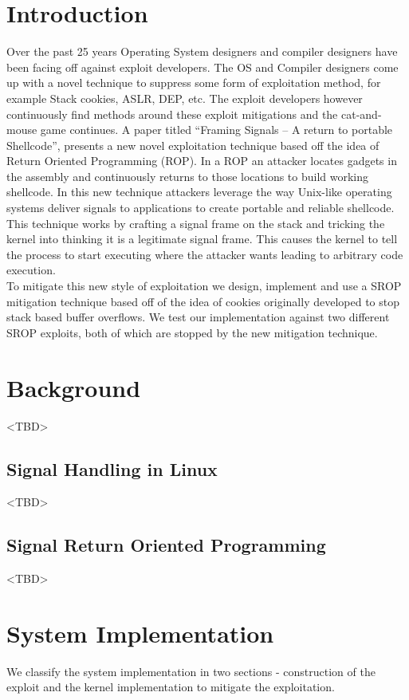 \documentclass{sig-alternate-05-2015}
\begin{document}
\section{Introduction}
Over the past 25 years Operating System designers and compiler designers have been facing off against exploit developers. The OS and Compiler designers  come up with a novel technique to suppress some form of exploitation method, for example Stack cookies, ASLR, DEP, etc. The exploit developers however continuously find methods around these exploit mitigations and the cat-and-mouse game continues.  A paper titled “Framing Signals -- A return to portable Shellcode”,  presents a new novel exploitation technique based off the idea of Return Oriented Programming (ROP). In a ROP an attacker locates gadgets in the assembly and continuously returns to those locations to build working shellcode. In this new technique attackers leverage the way Unix-like operating systems deliver signals to applications to create portable and reliable shellcode. This technique works by crafting a signal frame on the stack and tricking the kernel into thinking it is a legitimate signal frame. This causes the kernel to tell the process to start executing where the attacker wants leading to arbitrary code execution.\\
\indent
To mitigate this new style of exploitation we design, implement and use a SROP mitigation technique based off of the idea of cookies originally developed to stop stack based buffer overflows. We test our implementation against two different SROP exploits, both of which are stopped by the new mitigation technique.

\section {Background}
<TBD>
\subsection{Signal Handling in Linux}
<TBD>
\subsection{Signal Return Oriented Programming}
<TBD>


\section {System Implementation}
We classify the system implementation in two sections - construction
of the exploit and the kernel implementation to mitigate the exploitation.
\end{document}
